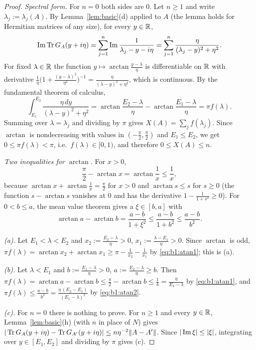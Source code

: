\begin{proof}
\emph{Spectral form.} For $n=0$ both sides are $0$. Let $n\ge1$ and write $\lambda_j:=\lambda_j(A)$. By Lemma~\ref{lem:basic}(d) applied to
$A$ (the lemma holds for Hermitian matrices of any size), for every $y\in\mathbb{R}$,
\[
\operatorname{Im}\operatorname{Tr} G_A(y+i\eta)=\sum_{j=1}^n\operatorname{Im}\frac1{\lambda_j-y-i\eta}=\sum_{j=1}^n\frac{\eta}{(\lambda_j-y)^2+\eta^2}.
\]
For fixed $\lambda\in\mathbb{R}$ the function $y\mapsto\arctan\frac{y-\lambda}\eta$ is differentiable on $\mathbb{R}$ with derivative
$\frac1\eta\big(1+\frac{(y-\lambda)^2}{\eta^2}\big)^{-1}=\frac{\eta}{(\lambda-y)^2+\eta^2}$, which is continuous. By the fundamental theorem of calculus,
\[
\int_{E_1}^{E_2}\frac{\eta\,dy}{(\lambda-y)^2+\eta^2}=\arctan\frac{E_2-\lambda}\eta-\arctan\frac{E_1-\lambda}\eta=\pi f(\lambda).
\]
Summing over $\lambda=\lambda_j$ and dividing by $\pi$ gives $X(A)=\sum_jf(\lambda_j)$. Since $\arctan$ is nondecreasing with values in
$(-\frac\pi2,\frac\pi2)$ and $E_1\le E_2$, we get $0\le\pi f(\lambda)<\pi$, i.e.\ $f(\lambda)\in[0,1)$, and therefore $0\le X(A)\le n$.

\emph{Two inequalities for $\arctan$.} For $x>0$,
\begin{equation}\label{eq:b1:atan1}
\frac\pi2-\arctan x=\arctan\frac1x\le\frac1x ,
\end{equation}
because $\arctan x+\arctan\frac1x=\frac\pi2$ for $x>0$ and $\arctan s\le s$ for $s\ge0$ (the function $s-\arctan s$ vanishes at $0$ and has the
derivative $1-\frac1{1+s^2}\ge0$). For $0<b\le a$, the mean value theorem gives a $\xi\in[b,a]$ with
\begin{equation}\label{eq:b1:atan2}
\arctan a-\arctan b=\frac{a-b}{1+\xi^2}\le\frac{a-b}{1+b^2}\le\frac{a-b}{b^2}.
\end{equation}

\emph{\textup{(a)}.} Let $E_1<\lambda<E_2$ and $x_2:=\frac{E_2-\lambda}\eta>0$, $x_1:=\frac{\lambda-E_1}\eta>0$. Since $\arctan$ is odd,
$\pi f(\lambda)=\arctan x_2+\arctan x_1\ge\pi-\frac1{x_2}-\frac1{x_1}$ by \eqref{eq:b1:atan1}; this is (a).

\emph{\textup{(b)}.} Let $\lambda<E_1$ and $b:=\frac{E_1-\lambda}\eta>0$, $a:=\frac{E_2-\lambda}\eta\ge b$. Then
$\pi f(\lambda)=\arctan a-\arctan b\le\frac\pi2-\arctan b\le\frac1b=\frac{\eta}{E_1-\lambda}$ by \eqref{eq:b1:atan1}, and
$\pi f(\lambda)\le\frac{a-b}{b^2}=\frac{\eta\,(E_2-E_1)}{(E_1-\lambda)^2}$ by \eqref{eq:b1:atan2}.

\emph{\textup{(c)}.} For $n=0$ there is nothing to prove. For $n\ge1$ and every $y\in\mathbb{R}$, Lemma~\ref{lem:basic}(h) (with $n$ in place of $N$) gives
$|\operatorname{Tr} G_A(y+i\eta)-\operatorname{Tr} G_{A'}(y+i\eta)|\le n\eta^{-2}\|A-A'\|$. Since $|\operatorname{Im}\xi|\le|\xi|$, integrating over $y\in[E_1,E_2]$ and dividing by $\pi$ gives (c).
\end{proof}

